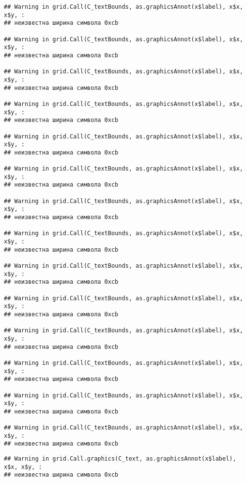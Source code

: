 \documentclass[
]{article}
\begin{document}
\begin{verbatim}
## Warning in grid.Call(C_textBounds, as.graphicsAnnot(x$label), x$x, x$y, :
## неизвестна ширина символа 0xcb

## Warning in grid.Call(C_textBounds, as.graphicsAnnot(x$label), x$x, x$y, :
## неизвестна ширина символа 0xcb

## Warning in grid.Call(C_textBounds, as.graphicsAnnot(x$label), x$x, x$y, :
## неизвестна ширина символа 0xcb

## Warning in grid.Call(C_textBounds, as.graphicsAnnot(x$label), x$x, x$y, :
## неизвестна ширина символа 0xcb

## Warning in grid.Call(C_textBounds, as.graphicsAnnot(x$label), x$x, x$y, :
## неизвестна ширина символа 0xcb

## Warning in grid.Call(C_textBounds, as.graphicsAnnot(x$label), x$x, x$y, :
## неизвестна ширина символа 0xcb

## Warning in grid.Call(C_textBounds, as.graphicsAnnot(x$label), x$x, x$y, :
## неизвестна ширина символа 0xcb

## Warning in grid.Call(C_textBounds, as.graphicsAnnot(x$label), x$x, x$y, :
## неизвестна ширина символа 0xcb

## Warning in grid.Call(C_textBounds, as.graphicsAnnot(x$label), x$x, x$y, :
## неизвестна ширина символа 0xcb

## Warning in grid.Call(C_textBounds, as.graphicsAnnot(x$label), x$x, x$y, :
## неизвестна ширина символа 0xcb

## Warning in grid.Call(C_textBounds, as.graphicsAnnot(x$label), x$x, x$y, :
## неизвестна ширина символа 0xcb

## Warning in grid.Call(C_textBounds, as.graphicsAnnot(x$label), x$x, x$y, :
## неизвестна ширина символа 0xcb

## Warning in grid.Call(C_textBounds, as.graphicsAnnot(x$label), x$x, x$y, :
## неизвестна ширина символа 0xcb

## Warning in grid.Call(C_textBounds, as.graphicsAnnot(x$label), x$x, x$y, :
## неизвестна ширина символа 0xcb
\end{verbatim}

\begin{verbatim}
## Warning in grid.Call.graphics(C_text, as.graphicsAnnot(x$label), x$x, x$y, :
## неизвестна ширина символа 0xcb
\end{verbatim}
\end{document}
